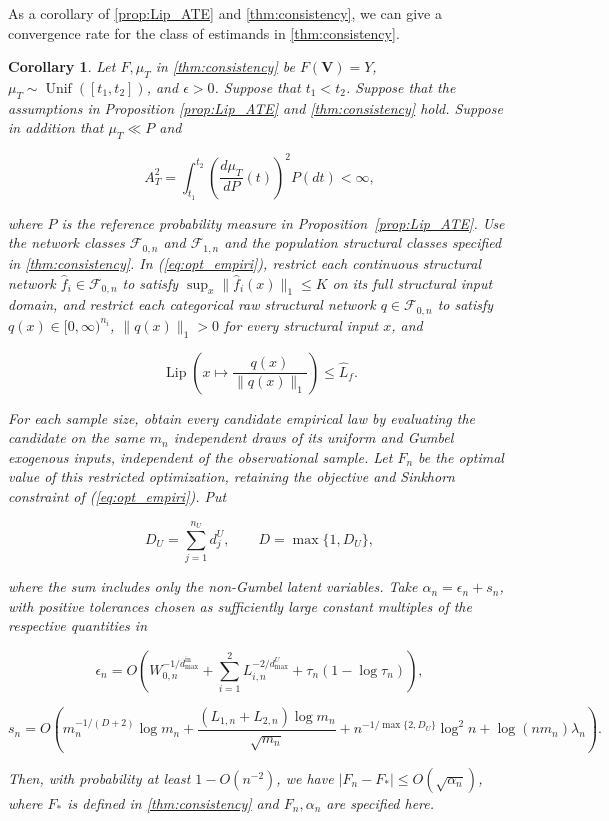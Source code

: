 \documentclass[12pt]{article}
\theoremstyle{plain}
\newtheorem{corollary}[theorem]{Corollary}
\theoremstyle{definition}
\theoremstyle{remark}
\begin{document}
As a corollary of \cref{prop:Lip_ATE} and \cref{thm:consistency}, we can give a convergence rate for the class of estimands in \cref{thm:consistency}. 
\begin{corollary}\label{cor:rate}
Let $F,\mu_T$ in \cref{thm:consistency} be $F(\boldsymbol V)=Y$, $\mu_T\sim\operatorname{Unif}([t_1,t_2])$, and $\epsilon>0$. Suppose that $t_1<t_2$. Suppose that the assumptions in Proposition \ref{prop:Lip_ATE} and \cref{thm:consistency} hold. Suppose in addition that $\mu_T\ll P$ and

\[
A_T^2=\int_{t_1}^{t_2}\left(\frac{d\mu_T}{dP}(t)\right)^2P(dt)<\infty,
\]

where $P$ is the reference probability measure in Proposition~\ref{prop:Lip_ATE}. Use the network classes $\mathcal F_{0,n}$ and $\mathcal F_{1,n}$ and the population structural classes specified in \cref{thm:consistency}. In (\ref{eq:opt_empiri}), restrict each continuous structural network $\hat f_i\in\mathcal F_{0,n}$ to satisfy $\sup_x\|\hat f_i(x)\|_1\leqslant K$ on its full structural input domain, and restrict each categorical raw structural network $q\in\mathcal F_{0,n}$ to satisfy $q(x)\in[0,\infty)^{n_i}$, $\|q(x)\|_1>0$ for every structural input $x$, and

\[
\operatorname{Lip}\left(x\mapsto\frac{q(x)}{\|q(x)\|_1}\right)\leqslant\hat L_f.
\]

For each sample size, obtain every candidate empirical law by evaluating the candidate on the same $m_n$ independent draws of its uniform and Gumbel exogenous inputs, independent of the observational sample. Let $F_n$ be the optimal value of this restricted optimization, retaining the objective and Sinkhorn constraint of (\ref{eq:opt_empiri}). Put

\[
D_U=\sum_{j=1}^{n_U}d_j^U,\qquad D=\max\{1,D_U\},
\]

where the sum includes only the non-Gumbel latent variables. Take $\alpha_n=\epsilon_n+s_n$, with positive tolerances chosen as sufficiently large constant multiples of the respective quantities in

\[
\epsilon_n=O\left(W_{0,n}^{-1/d_{\max}^{\text{in}}}+\sum_{i=1}^2L_{i,n}^{-2/d_{\max}^U}+\tau_n(1-\log\tau_n)\right),
\]

\[
s_n=O\left(m_n^{-1/(D+2)}\log m_n+\frac{(L_{1,n}+L_{2,n})\log m_n}{\sqrt{m_n}}+n^{-1/\max\{2,D_U\}}\log^2n+\log(nm_n)\lambda_n\right).
\]

Then, with probability at least $1-O(n^{-2})$, we have $|F_n-F_*|\leqslant O(\sqrt{\alpha_n})$, where $F_*$ is defined in \cref{thm:consistency} and $F_n,\alpha_n$ are specified here.


\end{corollary}
\end{document}
